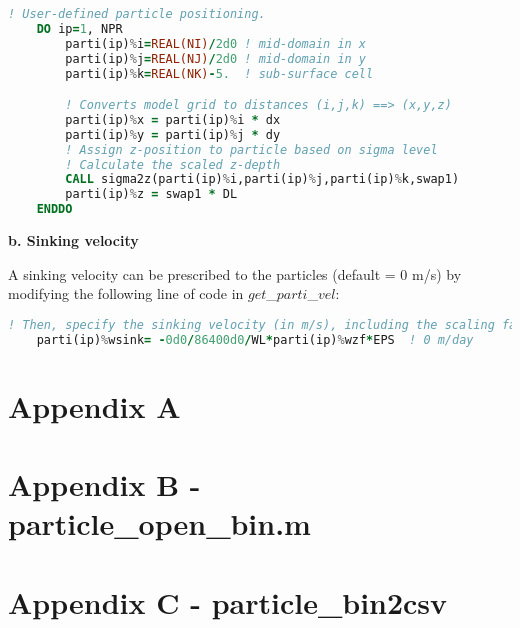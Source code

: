 \documentclass[12pt,letterpaper,titlepage]{article}
\begin{document}
\begin{lstlisting}[language=fortran]
! User-defined particle positioning.    
	DO ip=1, NPR
		parti(ip)%i=REAL(NI)/2d0 ! mid-domain in x
		parti(ip)%j=REAL(NJ)/2d0 ! mid-domain in y
		parti(ip)%k=REAL(NK)-5.  ! sub-surface cell

		! Converts model grid to distances (i,j,k) ==> (x,y,z)
		parti(ip)%x = parti(ip)%i * dx
		parti(ip)%y = parti(ip)%j * dy
		! Assign z-position to particle based on sigma level
		! Calculate the scaled z-depth
		CALL sigma2z(parti(ip)%i,parti(ip)%j,parti(ip)%k,swap1)
		parti(ip)%z = swap1 * DL
	ENDDO
\end{lstlisting}
\textbf{\indent b. Sinking velocity\\}

A sinking velocity can be prescribed to the particles (default = 0 m/s) by modifying the following line of code in $get$\_$parti$\_$vel$:

\begin{lstlisting}[language=fortran]
! Then, specify the sinking velocity (in m/s), including the scaling factors
	parti(ip)%wsink= -0d0/86400d0/WL*parti(ip)%wzf*EPS  ! 0 m/day
\end{lstlisting}


\pagebreak
\appendix
%

\section{Appendix A}
\label{app: particle_sinking}


\section{Appendix B - particle\_open\_bin.m}
\label{app: particle_open_bin}

\pagebreak

\section{Appendix C - particle\_bin2csv}
\label{app: particle_bin2csv}


\pagebreak
\glsaddall				%
\renewcommand*{\arraystretch}{0.3}%
\printglossaries
\end{document}

